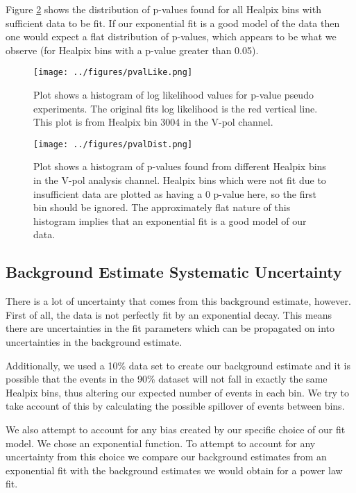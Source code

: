 Figure \ref{fig:pvalDist} shows the distribution of p-values found for all Healpix bins with sufficient data to be fit.  If our exponential fit is a good model of the data then one would expect a flat distribution of p-values, which appears to be what we observe (for Healpix bins with a p-value greater than 0.05). 

\begin{figure}[h]
\centering
\texttt{[image: ../figures/pvalLike.png]}
\caption[P-value Pseudo Experiments Histogram]{Plot shows a histogram of log likelihood values for p-value pseudo experiments.  The original fits log likelihood is the red vertical line.  This plot is from Healpix bin 3004 in the V-pol channel.}
\label{fig:pvalLike}
\end{figure}

\begin{figure}[h]
\centering
\texttt{[image: ../figures/pvalDist.png]}
\caption[P-value Histogram]{Plot shows a histogram of p-values found from different Healpix bins in the V-pol analysis channel.  Healpix bins which were not fit due to insufficient data are plotted as having a 0 p-value here, so the first bin should be ignored.  The approximately flat nature of this histogram implies that an exponential fit is a good model of our data.}
\label{fig:pvalDist}
\end{figure}
 
\subsection{Background Estimate Systematic Uncertainty}

There is a lot of uncertainty that comes from this background estimate, however.  First of all, the data is not perfectly fit by an exponential decay.  This means there are uncertainties in the fit parameters which can be propagated on into uncertainties in the background estimate.  

Additionally, we used a 10\% data set to create our background estimate and it is possible that the events in the 90\% dataset will not fall in exactly the same Healpix bins, thus altering our expected number of events in each bin.  We try to take account of this by calculating the possible spillover of events between bins.

We also attempt to account for any bias created by our specific choice of our fit model.  We chose an exponential function.  To attempt to account for any uncertainty from this choice we compare our background estimates from an exponential fit with the background estimates we would obtain for a power law fit.

